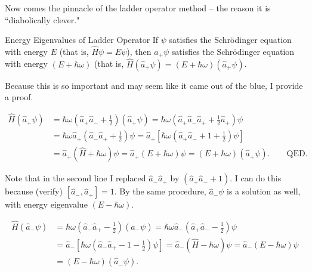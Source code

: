Now comes the pinnacle of the ladder operator method -- the reason it is
``diabolically clever." \\

\begin{mainbox}{Energy Eigenvalues of Ladder Operator}
If $\psi$ satisfies the Schr\"odinger equation with energy $E$
(that is, $\hat{H}\psi = E\psi$), then $a_+ \psi$ satisfies the Schr\"odinger
equation with energy $(E+\hbar \omega)$ (that is, $\hat{H}(\hat{a}_+ \psi)
= (E+\hbar \omega)(\hat{a}_+\psi)$.
\end{mainbox} \vspace{3px}

Because this is so important and may seem like it came out of the blue,
I provide a proof. 

\begin{align}
  \hat{H}(\hat{a}_+\psi) &= \hbar\omega\left(\hat{a}_+\hat{a}_-
  + \frac{1}{2}\right)(\hat{a}_+\psi) = \hbar\omega \left(
\hat{a}_+\hat{a}_-\hat{a}_+ + \frac{1}{2}\hat{a}_+ \right) \psi \\ 
                         &= \hbar \omega \hat{a}_+ \left( \hat{a}_-\hat{a}_+
                         + \frac{1}{2} \right) \psi = \hat{a}_+ \left[
                         \hbar\omega \left( \hat{a}_+ \hat{a}_-
                       + 1 + \frac{1}{2} \right) \psi\right] \\
      &= \hat{a}_+(\hat{H} + \hbar \omega) \psi = \hat{a}_+(E+\hbar\omega)\psi
      = (E +\hbar\omega)(\hat{a}_+\psi). \qquad \text{QED}.
  \end{align} \vspace{3px}

Note that in the second line I replaced $\hat{a}_-\hat{a}_+$ by
$(\hat{a}_+\hat{a}_- + 1)$. I can do this because (verify) $[\hat{a}_-,
\hat{a}_+] = 1$. By the same procedure, $\hat{a}_-\psi$ is a solution as well,
with energy eigenvalue $(E - \hbar\omega)$. 

\begin{align} \label{}
  \hat{H}(\hat{a}_-\psi) &= \hbar\omega \left( \hat{a}_-\hat{a}_+ - \frac{1}{2}
  \right) (\hat{a}_-\psi) = \hbar\omega \hat{a}_- \left( \hat{a}_+ \hat{a}_-
  - \frac{1}{2} \right) \psi \\ &= \hat{a}_-\left[ \hbar\omega \left(
\hat{a}_-\hat{a}_+ - 1 -\frac{1}{2} \right) \psi\right] = \hat{a}_- \left(
  \hat{H} - \hbar\omega \right) \psi = \hat{a}_-(E-\hbar\omega)\psi \\ &=
  (E-\hbar\omega)(\hat{a}_-\psi).   
\end{align}\vspace{3px}


